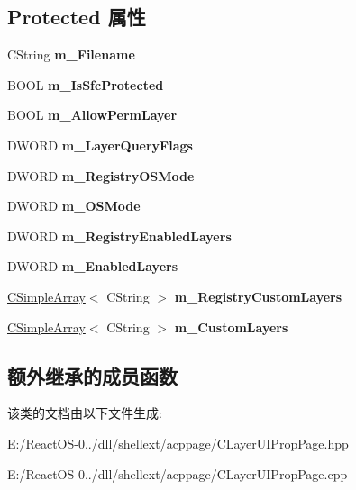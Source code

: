 \subsection*{Protected 属性}
\begin{DoxyCompactItemize}
\item 
\mbox{\label{class_c_layer_u_i_prop_page_a6ae8cbf3723d810ae05922cfe300bf9a}} 
C\+String {\bfseries m\+\_\+\+Filename}
\item 
\mbox{\label{class_c_layer_u_i_prop_page_a4a00bf3480a6ae968624aa567673b4e5}} 
B\+O\+OL {\bfseries m\+\_\+\+Is\+Sfc\+Protected}
\item 
\mbox{\label{class_c_layer_u_i_prop_page_af069459ba910323beddc833c1434b70e}} 
B\+O\+OL {\bfseries m\+\_\+\+Allow\+Perm\+Layer}
\item 
\mbox{\label{class_c_layer_u_i_prop_page_a4c5eae17f0bddfdb472b58d4429fc859}} 
D\+W\+O\+RD {\bfseries m\+\_\+\+Layer\+Query\+Flags}
\item 
\mbox{\label{class_c_layer_u_i_prop_page_af8c5133d33746b528a27171a2c9927ab}} 
D\+W\+O\+RD {\bfseries m\+\_\+\+Registry\+O\+S\+Mode}
\item 
\mbox{\label{class_c_layer_u_i_prop_page_a831b6b61e56d1e2a3ed16abf9126b6c9}} 
D\+W\+O\+RD {\bfseries m\+\_\+\+O\+S\+Mode}
\item 
\mbox{\label{class_c_layer_u_i_prop_page_aaa5fe73d8c93b8f30a37a6854f374113}} 
D\+W\+O\+RD {\bfseries m\+\_\+\+Registry\+Enabled\+Layers}
\item 
\mbox{\label{class_c_layer_u_i_prop_page_abb6b8a03e5ab33b576d98339d2e3abe4}} 
D\+W\+O\+RD {\bfseries m\+\_\+\+Enabled\+Layers}
\item 
\mbox{\label{class_c_layer_u_i_prop_page_ab9ad21159e2de6e1490500f7b4ac9cf8}} 
\hyperlink{struct_c_simple_array}{C\+Simple\+Array}$<$ C\+String $>$ {\bfseries m\+\_\+\+Registry\+Custom\+Layers}
\item 
\mbox{\label{class_c_layer_u_i_prop_page_a199b558885b25a47218c5f9c454157e9}} 
\hyperlink{struct_c_simple_array}{C\+Simple\+Array}$<$ C\+String $>$ {\bfseries m\+\_\+\+Custom\+Layers}
\end{DoxyCompactItemize}
\subsection*{额外继承的成员函数}


该类的文档由以下文件生成\+:\begin{DoxyCompactItemize}
\item 
E\+:/\+React\+O\+S-\/0../dll/shellext/acppage/C\+Layer\+U\+I\+Prop\+Page.\+hpp\item 
E\+:/\+React\+O\+S-\/0../dll/shellext/acppage/C\+Layer\+U\+I\+Prop\+Page.\+cpp\end{DoxyCompactItemize}
